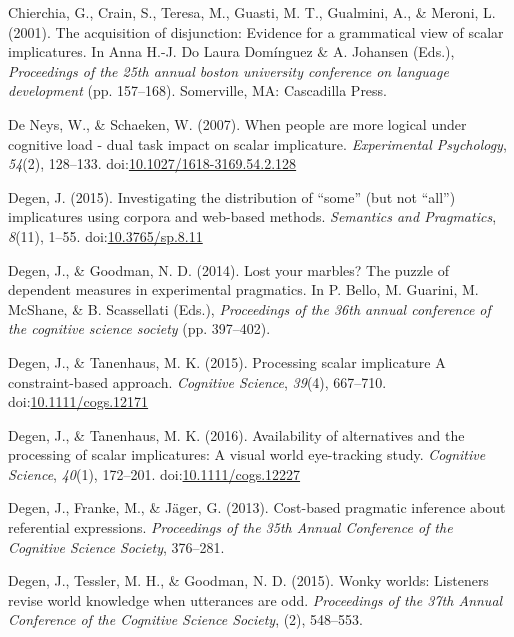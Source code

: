 \documentclass[man]{apa6}
\theoremstyle{definition}
\theoremstyle{definition}
\theoremstyle{definition}
\theoremstyle{remark}
\begin{document}
\hypertarget{ref-chierchia2001}{}
Chierchia, G., Crain, S., Teresa, M., Guasti, M. T., Gualmini, A., \&
Meroni, L. (2001). The acquisition of disjunction: Evidence for a
grammatical view of scalar implicatures. In Anna H.-J. Do Laura
Domínguez \& A. Johansen (Eds.), \emph{Proceedings of the 25th annual
boston university conference on language development} (pp. 157--168).
Somerville, MA: Cascadilla Press.

\hypertarget{ref-DeNeys2007}{}
De Neys, W., \& Schaeken, W. (2007). When people are more logical under
cognitive load - dual task impact on scalar implicature.
\emph{Experimental Psychology}, \emph{54}(2), 128--133.
doi:\href{https://doi.org/10.1027/1618-3169.54.2.128}{10.1027/1618-3169.54.2.128}

\hypertarget{ref-Degen2015}{}
Degen, J. (2015). Investigating the distribution of ``some'' (but not
``all'') implicatures using corpora and web-based methods.
\emph{Semantics and Pragmatics}, \emph{8}(11), 1--55.
doi:\href{https://doi.org/10.3765/sp.8.11}{10.3765/sp.8.11}

\hypertarget{ref-Degen2014}{}
Degen, J., \& Goodman, N. D. (2014). Lost your marbles? The puzzle of
dependent measures in experimental pragmatics. In P. Bello, M. Guarini,
M. McShane, \& B. Scassellati (Eds.), \emph{Proceedings of the 36th
annual conference of the cognitive science society} (pp. 397--402).

\hypertarget{ref-DegenTanenhaus2015}{}
Degen, J., \& Tanenhaus, M. K. (2015). Processing scalar implicature A
constraint-based approach. \emph{Cognitive Science}, \emph{39}(4),
667--710.
doi:\href{https://doi.org/10.1111/cogs.12171}{10.1111/cogs.12171}

\hypertarget{ref-DegenTanenhaus2016}{}
Degen, J., \& Tanenhaus, M. K. (2016). Availability of alternatives and
the processing of scalar implicatures: A visual world eye-tracking
study. \emph{Cognitive Science}, \emph{40}(1), 172--201.
doi:\href{https://doi.org/10.1111/cogs.12227}{10.1111/cogs.12227}

\hypertarget{ref-Degen2013}{}
Degen, J., Franke, M., \& Jäger, G. (2013). Cost-based pragmatic
inference about referential expressions. \emph{Proceedings of the 35th
Annual Conference of the Cognitive Science Society}, 376--281.

\hypertarget{ref-DegenTG2015}{}
Degen, J., Tessler, M. H., \& Goodman, N. D. (2015). Wonky worlds:
Listeners revise world knowledge when utterances are odd.
\emph{Proceedings of the 37th Annual Conference of the Cognitive Science
Society}, (2), 548--553.
\end{document}
